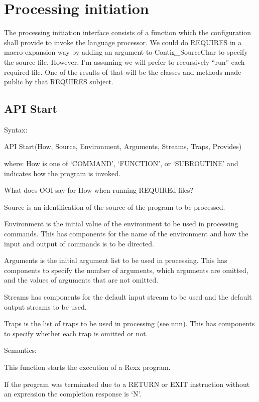 \hypertarget{processing-initiation}{%
\section{Processing initiation}\label{processing-initiation}}

The processing initiation interface consists of a function which the
configuration shall provide to invoke the language processor. We could
do REQUIRES in a macro-expansion way by adding an argument to
Contig\_SourceChar to specify the source file. However, I'm assuming we
will prefer to recursively ``run'' each required file. One of the
results of that will be the classes and methods made public by that
REQUIRES subject.

\hypertarget{api-start}{%
\subsection{API Start}\label{api-start}}

Syntax:

API Start(How, Source, Environment, Arguments, Streams, Traps, Provides)

where: How is one of `COMMAND', `FUNCTION', or `SUBROUTINE' and
indicates how the program is invoked.

What does OOI say for How when running REQUIREd files?

Source is an identification of the source of the program to be
processed.

Environment is the initial value of the environment to be used in
processing commands. This has components for the name of the environment
and how the input and output of commands is to be directed.

Arguments is the initial argument list to be used in processing. This
has components to specify the number of arguments, which arguments are
omitted, and the values of arguments that are not omitted.

Streams has components for the default input stream to be used and the
default output streams to be used.

Traps is the list of traps to be used in processing (see nnn). This has
components to specify whether each trap is omitted or not.

Semantics:

This function starts the execution of a Rexx program.

If the program was terminated due to a RETURN or EXIT instruction
without an expression the completion response is `N'.

